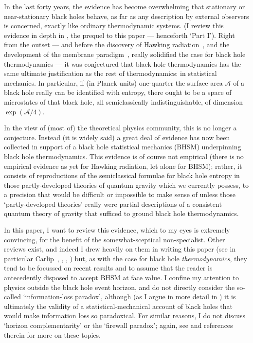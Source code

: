 \documentclass{article}
\newcommand{\mc}[1]{\ensuremath{\mathcal{#1}}}
\begin{document}
In the last forty years, the evidence has become overwhelming that stationary or near-stationary black holes behave, as far as any description by external observers is concerned, exactly like ordinary thermodynamic systems. (I review this evidence in depth in , the prequel to this paper --- henceforth `Part I'). Right from the outset --- and before the discovery of Hawking radiation~\cite{hawking1975}, and the development of the membrane paradigm~\cite{membraneparadigm}, really solidified the case for black hole thermodynamics --- it was conjectured that black hole thermodynamics has the same ultimate justification as the rest of thermodynamics: in statistical mechanics. In particular, if (in Planck units) one-quarter the surface area $\mc{A}$ of a black hole really can be identified with entropy, there ought to be a space of microstates of that black hole, all semiclassically indistinguishable, of dimension $\exp(\mc{A}/4)$.

In the view of (most of) the theoretical physics community, this is no longer a conjecture. Instead (it is widely said) a great deal of evidence has now been collected in support of a black hole statistical mechanics (BHSM) underpinning black hole thermodynamics. This evidence is of course not empirical (there is no empirical evidence as yet for Hawking radiation, let alone for BHSM); rather, it consists of reproductions of the semiclassical formulae for black hole entropy in those partly-developed theories of quantum gravity which we currently possess, to a precision that would be difficult or impossible to make sense of unless those `partly-developed theories' really were partial descriptions of a consistent quantum theory of gravity that sufficed to ground black hole thermodynamics.

In this paper, I want to review this evidence, which to my eyes is extremely convincing, for the benefit of the somewhat-sceptical non-specialist. Other reviews exist, and indeed I drew heavily on them in writing this paper (see in particular Carlip~\citeyear{carlipreview,carlipreview2}, , ,  ) but, as with the case for black hole \emph{thermodynamics}, they tend to be focussed on recent results and to assume that the reader is antecedently disposed to accept BHSM at face value. I confine my attention to physics outside the black hole event horizon, and do not directly consider the so-called `information-loss paradox', although (as I argue in more detail in ) it is ultimately the validity of a statistical-mechanical account of black holes that would make information loss so paradoxical. For similar reasons, I do not discuss `horizon complementarity' or the `firewall paradox'; again, see  and references therein for more on these topics.
\end{document}
